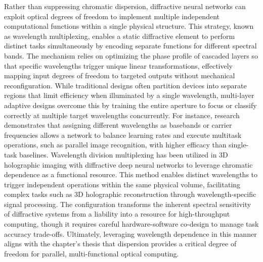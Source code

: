 \documentclass[11pt]{article}
\begin{document}
Rather than suppressing chromatic dispersion, diffractive neural networks can exploit optical degrees of freedom to implement multiple independent computational functions within a single physical structure. This strategy, known as wavelength multiplexing, enables a static diffractive element to perform distinct tasks simultaneously by encoding separate functions for different spectral bands. The mechanism relies on optimizing the phase profile of cascaded layers so that specific wavelengths trigger unique linear transformations, effectively mapping input degrees of freedom to targeted outputs without mechanical reconfiguration. While traditional designs often partition devices into separate regions that limit efficiency when illuminated by a single wavelength, multi-layer adaptive designs overcome this by training the entire aperture to focus or classify correctly at multiple target wavelengths concurrently. For instance, research demonstrates that assigning different wavelengths as basebands or carrier frequencies allows a network to balance learning rates and execute multitask operations, such as parallel image recognition, with higher efficacy than single-task baselines. Wavelength division multiplexing has been utilized in 3D holographic imaging with diffractive deep neural networks to leverage chromatic dependence as a functional resource. This method enables distinct wavelengths to trigger independent operations within the same physical volume, facilitating complex tasks such as 3D holographic reconstruction through wavelength-specific signal processing. \citep{doi_10_1109_acp_ipoc63121_2024_10809872_a7935774} The configuration transforms the inherent spectral sensitivity of diffractive systems from a liability into a resource for high-throughput computing, though it requires careful hardware-software co-design to manage task accuracy trade-offs. Ultimately, leveraging wavelength dependence in this manner aligns with the chapter's thesis that dispersion provides a critical degree of freedom for parallel, multi-functional optical computing. \citep{doi_10_1038_s41377_022_00903_8_098356a7} \citep{doi_10_1364_prj_576203_ae347fba} \citep{doi_10_1364_ol_460186_da35c128} \citep{doi_10_1155_2020_9748380_13fcb0d2} \citep{s2_88f87b34acdb11cf20ad16d6fbdd5399e8617f8f_a548a720}
\end{document}
